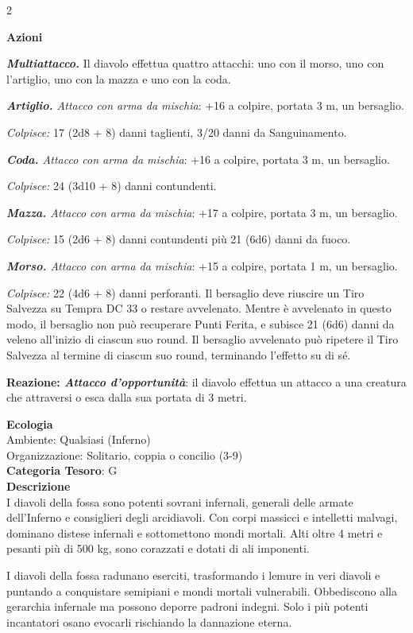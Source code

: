 \begin{multicols}{2}
{\textbf{Azioni}

\emph{\textbf{Multiattacco.}} Il diavolo effettua quattro attacchi: uno con il morso, uno con l'artiglio, uno con la mazza e uno con la coda.

\emph{\textbf{Artiglio.} Attacco con arma da mischia}: +16 a colpire, portata 3 m, un bersaglio.

\emph{Colpisce:} 17 (2d8 + 8) danni taglienti, 3/20 danni da Sanguinamento.

\emph{\textbf{Coda.} Attacco con arma da mischia}: +16 a colpire, portata 3 m, un bersaglio.

\emph{Colpisce:} 24 (3d10 + 8) danni contundenti.

\emph{\textbf{Mazza.} Attacco con arma da mischia}: +17 a colpire, portata 3 m, un bersaglio.

\emph{Colpisce:} 15 (2d6 + 8) danni contundenti più 21 (6d6) danni da fuoco.

\emph{\textbf{Morso.} Attacco con arma da mischia}: +15 a colpire, portata 1 m, un bersaglio.

\emph{Colpisce:} 22 (4d6 + 8) danni perforanti. Il bersaglio deve riuscire un Tiro Salvezza su Tempra DC 33 o restare avvelenato. Mentre è avvelenato in questo modo, il bersaglio non può recuperare Punti Ferita, e subisce 21 (6d6) danni da veleno all'inizio di ciascun suo round. Il bersaglio avvelenato può ripetere il Tiro Salvezza al termine di ciascun suo round, terminando l'effetto su di sé.

\textbf{Reazione: \emph{Attacco d'opportunità}}: il diavolo effettua un attacco a una creatura che attraversi o esca dalla sua portata di 3 metri.

\textbf{Ecologia}\\
Ambiente: Qualsiasi (Inferno)\\
Organizzazione: Solitario, coppia o concilio (3-9)\\
\textbf{Categoria Tesoro}: G\\
\textbf{Descrizione}\\
I diavoli della fossa sono potenti sovrani infernali, generali delle armate dell'Inferno e consiglieri degli arcidiavoli. Con corpi massicci e intelletti malvagi, dominano distese infernali e sottomettono mondi mortali. Alti oltre 4 metri e pesanti più di 500 kg, sono corazzati e dotati di ali imponenti.

I diavoli della fossa radunano eserciti, trasformando i lemure in veri diavoli e puntando a conquistare semipiani e mondi mortali vulnerabili. Obbediscono alla gerarchia infernale ma possono deporre padroni indegni. Solo i più potenti incantatori osano evocarli rischiando la dannazione eterna.

}
\end{multicols}
